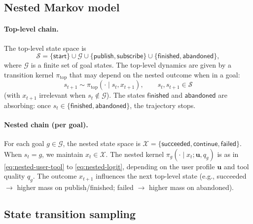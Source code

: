 \subsection{Nested Markov model}
\label{sec:method:model}

\paragraph{Top-level chain.}
The top-level state space is
\begin{equation}
  \mathcal{S} = \{\mathsf{start}\} \cup \mathcal{G} \cup \{\mathsf{publish},\mathsf{subscribe}\} \cup \{\mathsf{finished},\mathsf{abandoned}\},
\end{equation}
where $\mathcal{G}$ is a finite set of goal states. The top-level dynamics are given by a transition kernel $\pi_{\mathrm{top}}$ that may depend on the nested outcome when in a goal:
\begin{equation}
  s_{t+1} \sim \pi_{\mathrm{top}}(\cdot \mid s_t, x_{t+1}), \qquad s_t, s_{t+1} \in \mathcal{S}
\end{equation}
(with $x_{t+1}$ irrelevant when $s_t \notin \mathcal{G}$). The states $\mathsf{finished}$ and $\mathsf{abandoned}$ are absorbing: once $s_t \in \{\mathsf{finished},\mathsf{abandoned}\}$, the trajectory stops.

\paragraph{Nested chain (per goal).}
For each goal $g \in \mathcal{G}$, the nested state space is $\mathcal{X} = \{\mathsf{succeeded},\mathsf{continue},\mathsf{failed}\}$. When $s_t = g$, we maintain $x_t \in \mathcal{X}$. The nested kernel $\pi_g(\cdot \mid x_t; \mathbf{u}, q_g)$ is as in \eqref{eq:nested-user-tool} to \eqref{eq:nested-logit}, depending on the user profile $\mathbf{u}$ and tool quality $q_g$. The outcome $x_{t+1}$ influences the next top-level state (e.g., succeeded $\to$ higher mass on publish/finished; failed $\to$ higher mass on abandoned).

\subsection{State transition sampling}
\label{sec:method:transitions}

